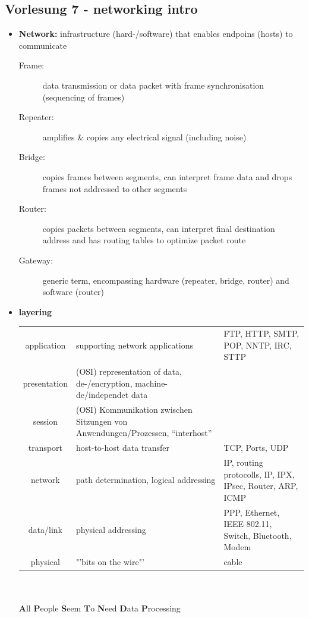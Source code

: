 \subsection*{Vorlesung 7 - networking intro}
 \begin{itemize}
  \item \textbf{Network:} infrastructure (hard-/software) that enables endpoins (hosts) to communicate
   \begin{description}
    \item[Frame:] data transmission or data packet with frame synchronisation (sequencing of frames)
    \item[Repeater:] amplifies \& copies any electrical signal (including noise)
    \item[Bridge:] copies frames between segments, can interpret frame data and drops frames not addressed to other segments
    \item[Router:] copies packets between segments, can interpret final destination address and has routing tables to optimize packet route
    \item[Gateway:] generic term, encompassing hardware (repeater, bridge, router) and software (router)
   \end{description}
  \item \textbf{layering} \\
   \begin{tabular}{|cp{8cm}p{6cm}|}
   \hline
   application & supporting network applications & FTP, HTTP, SMTP, POP, NNTP, IRC, STTP\\
   presentation & (OSI) representation of data, de-/encryption, machine-de/independet data & \\
   session & (OSI) Kommunikation zwischen Sitzungen von Anwendungen/Prozessen, "`interhost"' & \\
   transport & host-to-host data transfer & TCP, Ports, UDP \\
   network & path determination, logical addressing & IP, routing protocolls, IP, IPX, IPsec, Router, ARP, ICMP \\
   data/link & physical addressing & PPP, Ethernet, IEEE 802.11, Switch, Bluetooth, Modem \\
   physical & "'bits on the wire"' & cable \\
   \hline
   \end{tabular} \\ \\
   \textbf{A}ll \textbf{P}eople \textbf{S}eem \textbf{T}o \textbf{N}eed \textbf{D}ata \textbf{P}rocessing \\

\end{itemize}
